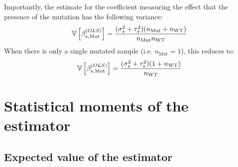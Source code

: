 %
Importantly, the estimate for the coefficient measuring the effect that the presence of the mutation has the following variance:
%
\begin{equation}
  \mathbb{V} \left[  \beta_{s,\mathrm{Mut}}^{(OLS)}  \right] = \frac{(\sigma_s^2 + \tau_s^2)(n_\mathrm{Mut} + n_\mathrm{WT})}{n_\mathrm{Mut} n_\mathrm{WT}}
\end{equation}
%
When there is only a single mutated sample (i.e. $n_\mathrm{Mut} = 1$), this reduces to:
%
\begin{equation}
  \mathbb{V} \left[  \beta_{s,\mathrm{Mut}}^{(OLS)}  \right] = \frac{(\sigma_s^2 + \tau_s^2)(1 + n_\mathrm{WT})}{n_\mathrm{WT}}
\end{equation}

\section{Statistical moments of the  estimator}
\label{sec:JS_moments}

\subsection{Expected value of the  estimator}

